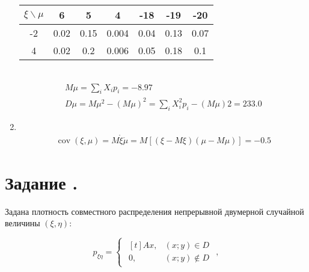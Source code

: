 \documentclass[12pt]{article}
\DeclareMathOperator{\cov}{cov}
\begin{document}
\begin{enumerate}
	      \begin{tabular}{|c|c|c|c|c|c|c|}
		      \hline
		      $\xi \backslash \mu$ & 6    & 5    & 4     & -18  & -19  & -20  \\
		      \hline
		      -2                   & 0.02 & 0.15 & 0.004 & 0.04 & 0.13 & 0.07 \\
		      \hline
		      4                    & 0.02 & 0.2  & 0.006 & 0.05 & 0.18 & 0.1  \\
		      \hline
	      \end{tabular} \\

	      \begin{gather*}
		      M\mu = \sum_iX_ip_i = -8.97 \\
		      D\mu = M\mu^2 - (M\mu)^2 = \sum_iX_i^2p_i - (M\mu)2 = 233.0
	      \end{gather*}

	\item \mbox{}\\
	      \begin{gather*}
		      \cov(\xi, \mu) = M\mathring{\xi}\mathring{\mu} = M[(\xi - M\xi)(\mu - M\mu)] = -0.5
	      \end{gather*}

\end{enumerate}

\section*{Задание .}

Задана плотность совместного распределения непрерывной двумерной случайной величины $(\xi, \eta)$:

\begin{equation*}
	p_{\xi\eta} =
	\begin{cases}
		\begin{aligned}[t]
			Ax, & (x;y) \in D    \\
			0,  & (x;y) \notin D
		\end{aligned}
	\end{cases},
\end{equation*}
\end{document}
